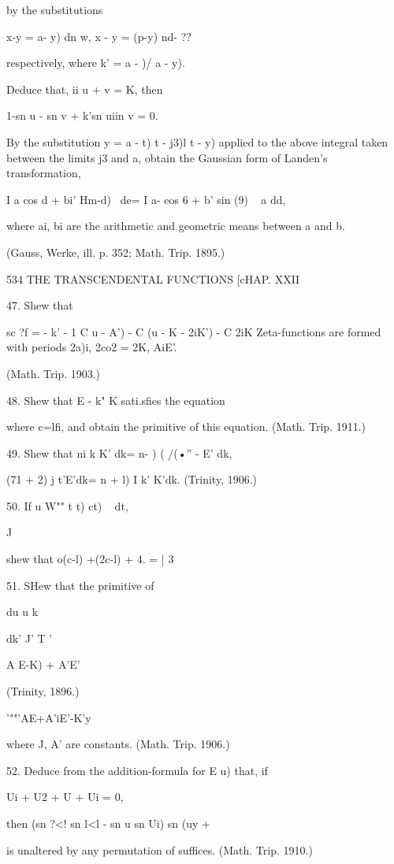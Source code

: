 by the substitutions

x-y = a- y) dn w, x - y = (p-y) nd- ??

respectively, where k' = a - )/ a - y).

Deduce that, ii u + v = K, then

1-sn u - sn v + k'sn uiin v = 0.

By the substitution y = a - t) t - j3)l t - y) applied to the above
integral taken between the limits j3 and a, obtain the Gaussian form
of Landen's transformation,

I a cos d + bi' Hm-d)~ de= I a- eos 6 + b' sin (9) ~ a dd,

where ai, bi are the arithmetic and geometric means between a and b.

(Gauss, Werke, ill. p. 352; Math. Trip. 1895.)

534 THE TRANSCENDENTAL FUNCTIONS [cHAP. XXII

47. Shew that

sc ?f = - k' - 1 C u - A') - C (u - K - 2iK') - C 2iK%
Zeta-functions are formed with periods 2a)i, 2co2 = 2K, AiE'.

(Math. Trip. 1903.)

48. Shew that E - k" K sati.sfies the equation

where c=lfi, and obtain the primitive of this equation. (Math. Trip.
1911.)

49. Shew that ni k K' dk= n- ) ( /(•'' - E' dk,

(71 + 2) j t'E'dk= n + l) I k' K'dk. (Trinity, 1906.)

50. If u W"" t t) ct) ~ dt,

  J

shew that o(c-l) +(2c-l) + 4. = | 3

51. SHew that the primitive of

du u k \

dk' J' T '

A E-K) + A'E'

(Trinity, 1896.)

'""'AE+A'iE'-K'y

where J, A' are constants. (Math. Trip. 1906.)

52. Deduce from the addition-formula for E u) that, if

Ui + U2 + U + Ui = 0,

then (sn ?<! sn l<l - sn u sn Ui) sn (uy + %

is unaltered by any permutation of suffices. (Math. Trip. 1910.)

